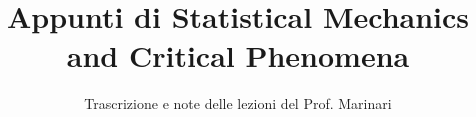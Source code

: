 \documentclass[a4paper,12pt]{article}
\title{Appunti di Statistical Mechanics and Critical Phenomena}
\author{Trascrizione e note delle lezioni del Prof. Marinari}
\date{}
\begin{document}
\maketitle
\projectintro
\tableofcontents
\newpage


% 
% 
% 
% 
\end{document}

